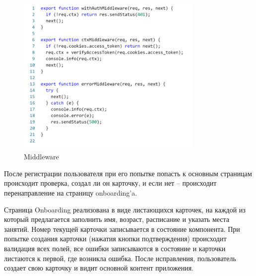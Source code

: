 \documentclass[14pt]{article}
\begin{document}
\begin{figure}[H!]
	\centering
	\includegraphics[width=0.8\textwidth]{fig6.png}
	\caption{Middleware}
\end{figure}

После регистрации пользователя при его попытке попасть к основным страницам происходит проверка, создал ли он карточку,
и если нет – происходит перенаправление на страницу onboarding’a.

Страница Onboarding реализована в виде листающихся карточек, на каждой из который предлагается заполнить имя, возраст,
расписание и указать места занятий. Номер текущей карточки записывается в состояние компонента. При попытке создания
карточки (нажатия кнопки подтверждения) происходит валидация всех полей, все ошибки записываются в состояние и карточки
листаются к первой, где возникла ошибка. После исправления, пользователь создает свою карточку и видит основной контент приложения.
\end{document}
